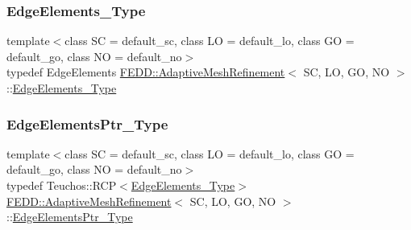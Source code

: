 \mbox{\label{classFEDD_1_1AdaptiveMeshRefinement_a891870bd161746dd633e1c8126d8fea1}} 
\subsubsection{\texorpdfstring{Edge\+Elements\+\_\+\+Type}{EdgeElements\_Type}}
{\footnotesize\ttfamily template$<$class SC = default\+\_\+sc, class LO = default\+\_\+lo, class GO = default\+\_\+go, class NO = default\+\_\+no$>$ \\
typedef Edge\+Elements \hyperlink{classFEDD_1_1AdaptiveMeshRefinement}{F\+E\+D\+D\+::\+Adaptive\+Mesh\+Refinement}$<$ SC, LO, GO, NO $>$\+::\hyperlink{classFEDD_1_1AdaptiveMeshRefinement_a891870bd161746dd633e1c8126d8fea1}{Edge\+Elements\+\_\+\+Type}}

\mbox{\label{classFEDD_1_1AdaptiveMeshRefinement_a495f60e86da92289b7fe1c15e291660d}} 
\subsubsection{\texorpdfstring{Edge\+Elements\+Ptr\+\_\+\+Type}{EdgeElementsPtr\_Type}}
{\footnotesize\ttfamily template$<$class SC = default\+\_\+sc, class LO = default\+\_\+lo, class GO = default\+\_\+go, class NO = default\+\_\+no$>$ \\
typedef Teuchos\+::\+R\+CP$<$\hyperlink{classFEDD_1_1AdaptiveMeshRefinement_a891870bd161746dd633e1c8126d8fea1}{Edge\+Elements\+\_\+\+Type}$>$ \hyperlink{classFEDD_1_1AdaptiveMeshRefinement}{F\+E\+D\+D\+::\+Adaptive\+Mesh\+Refinement}$<$ SC, LO, GO, NO $>$\+::\hyperlink{classFEDD_1_1AdaptiveMeshRefinement_a495f60e86da92289b7fe1c15e291660d}{Edge\+Elements\+Ptr\+\_\+\+Type}}

\mbox{\label{classFEDD_1_1AdaptiveMeshRefinement_ae08f7ca72876c1aba944120b3ca088d3}} 

